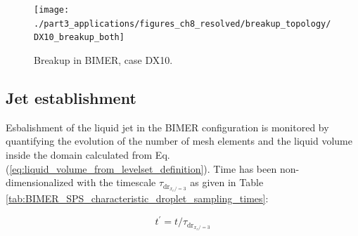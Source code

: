 \begin{figure}[ht]
\centering
\texttt{[image: ./part3\_applications/figures\_ch8\_resolved/breakup\_topology/DX10\_breakup\_both]}
\caption{Breakup in BIMER, case DX10. }
\label{fig:BIMER_breakup_topology}
\end{figure}

\subsection{Jet establishment}

Esbalishment of the liquid jet in the BIMER configuration is monitored by quantifying the evolution of the number of mesh elements and the liquid volume inside the domain calculated from Eq. (\ref{eq:liquid_volume_from_levelset_definition}). Time has been non-dimensionalized with the timescale $\tau_{\mathrm{dr}_{x_c/=3}}$ as given in Table \ref{tab:BIMER_SPS_characteristic_droplet_sampling_times}:



\begin{equation}
\label{eq:t_prime_BIMER_with_tau_drx10}
t^{\prime} = t / \tau_{\mathrm{dr}_{x_c/=3}}
\end{equation}


